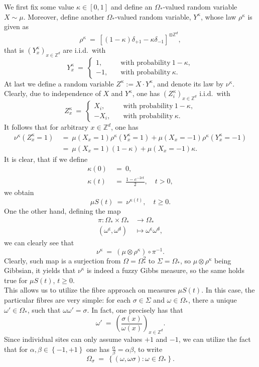 \documentclass[12pt]{article}
\newcommand{\Z}{\mathbb{Z}}
\newcommand{\set}[1]{\left\{#1\right\}}
\newcommand{\oklepaj}[1]{\left(#1\right)}
\newcommand{\oglati}[1]{\left[#1\right]}
\newcommand{\ra}{\rightarrow}
\newcommand{\1}{\mathbbm{1}}
\renewcommand{\c}{\mathsf{c}}
\newcommand{\5}{\vspace{0.5cm}}
\theoremstyle{definition}
\begin{document}
We first fix some value $\kappa\in[0,1]$ and define an $\Omega_*$-valued random variable $X\sim\mu$. Moreover, define another $\Omega_*$-valued random variable, $Y^\kappa$, whose law $\rho^\kappa$ is given as
$$\rho^\kappa ~=~ \oglati{(1-\kappa)\delta_{+1}-\kappa\delta_{-1}}^{\otimes\Z^d},$$
that is $(Y_x^\kappa)_{x\in\Z^d}$ are i.i.d.~with
$$Y_x^\kappa ~=~ \begin{cases}
1, \quad &\text{with probability}~1-\kappa,\\
-1, \quad &\text{with probability}~\kappa.	
\end{cases}$$
At last we define a random variable $Z^\kappa:=X\cdot Y^\kappa$, and denote its law by $\nu^\kappa$. Clearly, due to independence of $X$ and $Y^\kappa$, one has $(Z_i^\kappa)_{x\in\Z^d}$ i.i.d.~with 
$$Z_x^\kappa ~=~ \begin{cases}
X_i, \quad &\text{with probability}~1-\kappa,\\
-X_i, \quad &\text{with probability}~\kappa.
\end{cases}$$
It follows that for arbitrary $x\in\Z^d$, one has
\begin{align*}
\nu^\kappa(Z_x^\kappa=1) ~&=~ \mu(X_x=1)\rho^\kappa(Y_x^\kappa=1) + \mu(X_x=-1)\rho^\kappa(Y_x^\kappa=-1) \\
&=~ \mu(X_x=1)(1-\kappa)+\mu(X_x=-1)\kappa.
\end{align*}
It is clear, that if we  define 
\begin{align*}
\kappa(0) ~&=~ 0, \\
\kappa(t) ~&=~ \frac{1-e^{-2ct}}{2}, \quad t> 0,
\end{align*}
we obtain
$$\mu S(t) ~=~ \nu^{\kappa(t)}, \quad t\geq 0.$$
One the other hand, defining the map
\begin{align*}
\pi:\Omega_*\times\Omega_*&\ra\Omega_* \\
(\omega^\c,\omega^\mathsf{d})&\mapsto\omega^\c\omega^\mathsf{d},
\end{align*}
we can clearly see that
$$\nu^{\kappa} ~=~ (\mu\otimes\rho^\kappa)\circ\pi^{-1}.$$
Clearly, such map is a surjection from $\Omega=\Omega_*^2$ to $\Sigma=\Omega_*$, so $\mu\otimes\rho^\kappa$ being Gibbsian, it yields that $\nu^\kappa$ is indeed a fuzzy Gibbs measure, so the same holds true for $\mu S(t)$, $t\geq 0$. \\

This allows us to utilize the fibre approach on measures $\mu S(t)$. In this case, the particular fibres are very simple: for each $\sigma\in\Sigma$ and $\omega\in\Omega_*$, there a unique $\omega'\in\Omega_*$, such that $\omega\omega'=\sigma$. In fact, one precisely has that
$$\omega' ~=~ \oklepaj{\frac{\sigma(x)}{\omega(x)}}_{x\in\Z^d}.$$
Since individual sites can only assume values $+1$ and $-1$, we can utilize the fact that for $\alpha,\beta\in\set{-1,+1}$ one has $\frac{\alpha}{\beta}=\alpha\beta$, to write
$$\Omega_\sigma ~=~ \set{(\omega,\omega\sigma):\omega\in\Omega_*}.$$ 
\end{document}
